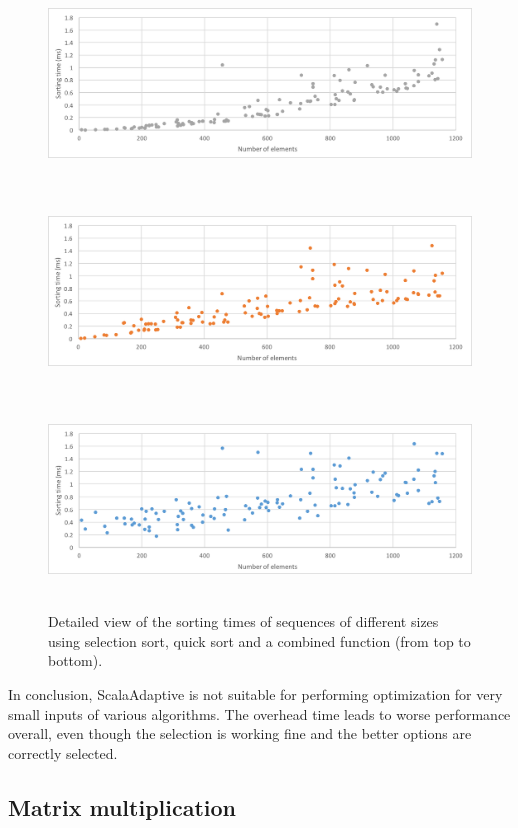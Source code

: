 \begin{figure}[h!]
	\captionsetup{justification=centering,margin=0.5cm}
	\centerline{
		\mbox{
			\includegraphics[width=130mm]{./img/sort_start_select.png}
		}
	}
	\centerline{
		\mbox{
			\includegraphics[width=130mm]{./img/sort_start_quick.png}
		}
	}
	\centerline{
		\mbox{
			\includegraphics[width=130mm]{./img/sort_start_combined.png}
		}
	}
	\caption{Detailed view of the sorting times of sequences of different sizes using selection sort, quick sort and a combined function (from top to bottom).}
	\label{fig:sorting_graph_start}
\end{figure}

In conclusion, ScalaAdaptive is not suitable for performing optimization for very small inputs of various algorithms. The overhead time leads to worse performance overall, even though the selection is working fine and the better options are correctly selected.

\subsection{Matrix multiplication}

